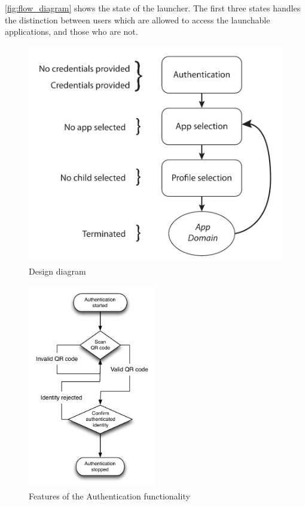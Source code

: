\autoref{fig:flow_diagram} shows the state of the launcher. The first three states handles the distinction between users which are allowed to access the launchable applications, and those who are not. 

\begin{figure}[h]
	\centering
	\includegraphics[width=1\textwidth]{gfx/design_diagram.pdf}
	\caption{Design diagram}
	\label{fig:design_diagram}
\end{figure}

\begin{figure}[h]
	\centering
	\includegraphics[width=0.5\textwidth]{gfx/authentication_design.pdf}
	\caption{Features of the Authentication functionality}
	\label{fig:authentication_design}
\end{figure}

